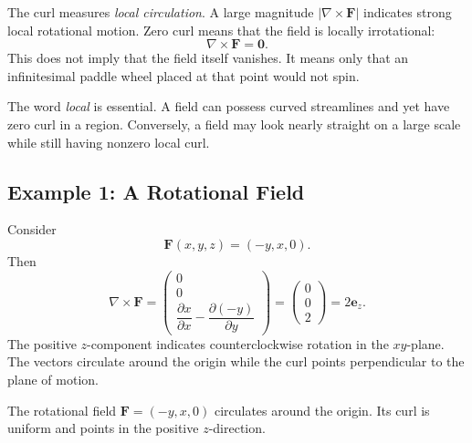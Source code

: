 The curl measures \emph{local circulation}. A large magnitude
$\lvert\nabla\times\mathbf F\rvert$ indicates strong local rotational motion.
Zero curl means that the field is locally irrotational:
\[
\nabla\times\mathbf F=\mathbf 0.
\]
This does not imply that the field itself vanishes. It means only that an
infinitesimal paddle wheel placed at that point would not spin.

The word \emph{local} is essential. A field can possess curved streamlines and
yet have zero curl in a region. Conversely, a field may look nearly straight
on a large scale while still having nonzero local curl.

\subsection{Example 1: A Rotational Field}

Consider
\[
\mathbf F(x,y,z)=(-y,x,0).
\]
Then
\[
\nabla\times\mathbf F
=
\begin{pmatrix}
0\\[1mm]
0\\[1mm]
\dfrac{\partial x}{\partial x}
-
\dfrac{\partial(-y)}{\partial y}
\end{pmatrix}
=
\begin{pmatrix}
0\\0\\2
\end{pmatrix}
=2\mathbf e_z.
\]
The positive $z$-component indicates counterclockwise rotation in the
$xy$-plane. The vectors circulate around the origin while the curl points
perpendicular to the plane of motion.

\begin{bookfigure}{The rotational field $\mathbf F=(-y,x,0)$ circulates around
the origin. Its curl is uniform and points in the positive $z$-direction.}
\end{bookfigure}

